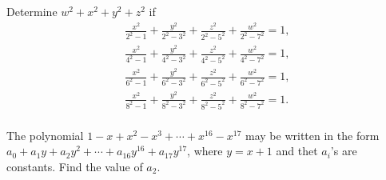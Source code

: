 \documentclass[11pt]{article}
\theoremstyle{definition}
\begin{document}
\begin{question}[name={1984 AIME, \href{https://artofproblemsolving.com/community/c6h66517p392635}{Problem 15}}]
	Determine $w^2+x^2+y^2+z^2$ if
	\[ \begin{array}{l} \displaystyle \frac{x^2}{2^2-1}+\frac{y^2}{2^2-3^2}+\frac{z^2}{2^2-5^2}+\frac{w^2}{2^2-7^2}=1, \\ \displaystyle \frac{x^2}{4^2-1}+\frac{y^2}{4^2-3^2}+\frac{z^2}{4^2-5^2}+\frac{w^2}{4^2-7^2}=1, \\ \displaystyle \frac{x^2}{6^2-1}+\frac{y^2}{6^2-3^2}+\frac{z^2}{6^2-5^2}+\frac{w^2}{6^2-7^2}=1, \\ \displaystyle \frac{x^2}{8^2-1}+\frac{y^2}{8^2-3^2}+\frac{z^2}{8^2-5^2}+\frac{w^2}{8^2-7^2}=1. \\ \end{array}  \]
\end{question}
%
%
%	
%	
%	
%	

% 

\begin{question}[name={1986 AIME, \href{https://artofproblemsolving.com/community/c4p394407}{Problem 11}}]
	The polynomial $1-x+x^2-x^3+\cdots+x^{16}-x^{17}$ may be written in the form $a_0+a_1y+a_2y^2+\cdots +a_{16}y^{16}+a_{17}y^{17}$, where $y=x+1$ and thet $a_i$'s are constants. Find the value of $a_2$.	
\end{question}

%
\end{document}
